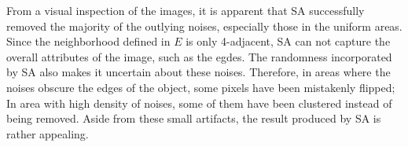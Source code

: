 \documentclass{article}
\begin{document}
From a visual inspection of the images, it is apparent that SA successfully removed the majority of the outlying noises, especially those in the uniform areas. Since the neighborhood defined in $E$ is only 4-adjacent, SA can not capture the overall attributes of the image, such as the egdes. The randomness incorporated by SA also makes it uncertain about these noises. Therefore, in areas where the noises obscure the edges of the object, some pixels have been mistakenly flipped; In area with high density of noises, some of them have been clustered instead of being removed. Aside from these small artifacts, the result produced by SA is rather appealing.


\end{document}
